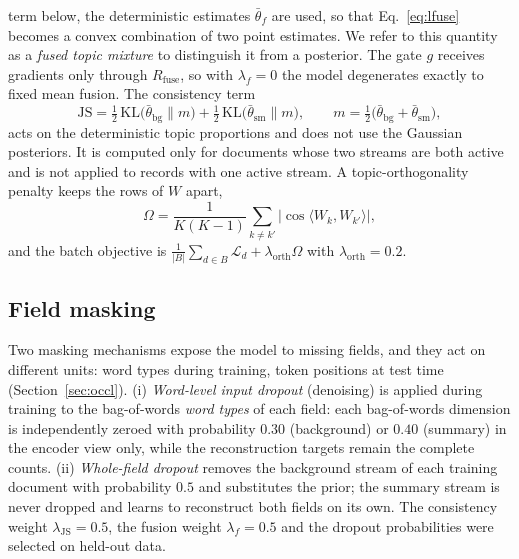 \documentclass[pdflatex,sn-basic]{sn-jnl}
\begin{document}
term below, the deterministic estimates $\bar\theta_f$ are used, so that Eq.~\eqref{eq:lfuse}
becomes a convex combination of two point estimates. We
refer to this quantity as a \emph{fused topic mixture} to distinguish it from a posterior. The
gate $g$ receives gradients only through $R_{\mathrm{fuse}}$, so with $\lambda_f=0$ the model
degenerates exactly to fixed mean fusion. The consistency term
\begin{equation}
\mathrm{JS}=\tfrac12\,\mathrm{KL}\!\big(\bar\theta_{\mathrm{bg}}\|m\big)
+\tfrac12\,\mathrm{KL}\!\big(\bar\theta_{\mathrm{sm}}\|m\big),
\qquad m=\tfrac12\big(\bar\theta_{\mathrm{bg}}+\bar\theta_{\mathrm{sm}}\big),
\label{eq:js}
\end{equation}
acts on the deterministic topic proportions and does not use the Gaussian posteriors. It is
computed only for documents whose two streams are both active and is not applied to records with
one active stream. A topic-orthogonality penalty keeps the rows of $W$ apart,
\begin{equation}
\Omega=\frac{1}{K(K-1)}\sum_{k\neq k'}\big|\cos\langle W_k,W_{k'}\rangle\big|,
\label{eq:orth}
\end{equation}
and the batch objective is $\frac{1}{|B|}\sum_{d\in B}\mathcal{L}_d
+\lambda_{\mathrm{orth}}\Omega$ with $\lambda_{\mathrm{orth}}=0.2$.

\subsection{Field masking}
Two masking mechanisms expose the model to missing fields, and they act on different units: word
types during training, token positions at test time (Section~\ref{sec:occl}).
(i) \emph{Word-level input dropout} (denoising) is applied during training to the bag-of-words
\emph{word types} of each field: each bag-of-words dimension is independently zeroed with
probability $0.30$ (background) or $0.40$ (summary) in the encoder view only, while the
reconstruction targets remain the complete counts. (ii) \emph{Whole-field dropout} removes the
background stream of each training document with probability $0.5$ and substitutes the prior; the
summary stream is never dropped and learns to reconstruct both fields on its own. The consistency
weight
$\lambda_{\mathrm{JS}}=0.5$, the fusion weight $\lambda_f=0.5$ and the dropout probabilities were
selected on held-out data.
\end{document}
